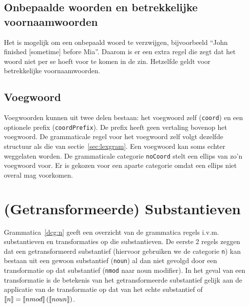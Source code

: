 \subsection{Onbepaalde woorden en betrekkelijke voornaamwoorden}
Het is mogelijk om een onbepaald woord te verzwijgen, bijvoorbeeld ``John finished [sometime] before Mia''. Daarom is er een extra regel die zegt dat het woord niet per se hoeft voor te komen in de zin. Hetzelfde geldt voor betrekkelijke voornaamwoorden.



\subsection{Voegwoord}
Voegwoorden kunnen uit twee delen bestaan: het voegwoord zelf (\texttt{coord}) en een optionele prefix (\texttt{coordPrefix}). De prefix heeft geen vertaling bovenop het voegwoord. De grammaticale regel voor het voegwoord zelf volgt dezelfde structuur als die van sectie~\ref{sec:lexgram}. Een voegwoord kan soms echter weggelaten worden. De grammaticale categorie \texttt{noCoord} stelt een ellips van zo'n voegwoord voor. Er is gekozen voor een aparte categorie omdat een ellips niet overal mag voorkomen.



\section{(Getransformeerde) Substantieven}
Grammatica~\ref{dcg:n} geeft een overzicht van de grammatica regels i.v.m. substantieven en transformaties op die substantieven. De eerste 2 regels zeggen dat een getransformeerd substantief (hiervoor gebruiken we de categorie \texttt{n}) kan bestaan uit een gewoon substantief (\texttt{noun}) al dan niet gevolgd door een transformatie op dat substantief (\texttt{nmod} naar noun modifier). In het geval van een transformatie is de betekenis van het getransformeerde substantief gelijk aan de applicatie van de transformatie op dat van het echte substantief of $\llbracket n\rrbracket = \llbracket nmod\rrbracket \left( \llbracket noun\rrbracket \right)$.

